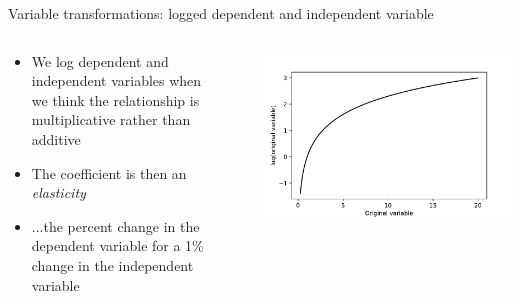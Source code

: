 \begin{frame}{Variable transformations: logged dependent and independent variable}
  \begin{columns}
    \begin{column}{0.65\textwidth}
      \begin{itemize}
        \item We log dependent and independent variables when we think the relationship is multiplicative rather than additive
        \item The coefficient is then an \emph{elasticity}
        \item ...the percent change in the dependent variable for a 1\% change in the independent variable
      \end{itemize}
    \end{column}~%
    \begin{column}{0.34\textwidth}
      \includegraphics[width=\textwidth]{fig/log.pdf}
    \end{column}
  \end{columns}
\end{frame}

